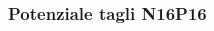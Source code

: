 \begin{frame}
\frametitle{Potenziale tagli N16P16}

\begin{columns}

\begin{column}{0.25 \textwidth}
\begin{center}
\begin{figure}[!h]
          \end{figure}
\end{center}
\end{column}

\begin{column}{0.25 \textwidth}
\begin{center}
\begin{figure}[!h]
\end{figure}
\end{center}
\end{column}

\begin{column}{0.25 \textwidth}
\begin{center}
\begin{figure}[!h]
\end{figure}
\end{center}
\end{column}

\begin{column}{0.25 \textwidth}
\begin{center}
\begin{figure}[!h]
\end{figure}
\end{center}
\end{column}

\end{columns}
\end{frame}





